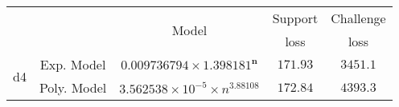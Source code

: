 \begin{tabular}{ccccc} 
\hline 
 &  & \multirow{2}{*}{Model} & Support & Challenge\tabularnewline 
 &  &  & loss  & loss\tabularnewline 
\hline 
\hline 
\multirow{2}{*}{d4} & Exp. Model & $\mathbf{0.009736794\times 1.398181^{n}}$ & $\mathbf{171.93}$ & $\mathbf{3451.1}$ \tabularnewline 
 & Poly. Model & $3.562538\times10^{-5}\times n^{3.88108}$ & $172.84$ & $4393.3$ \tabularnewline 
\hline 
\end{tabular} 

